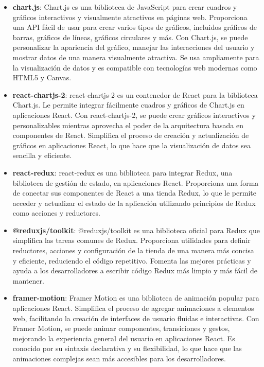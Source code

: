 \documentclass[journal]{IEEEtran}
\begin{document}
\begin{itemize}
  \item \textbf{chart.js}: 
  Chart.js es una biblioteca de JavaScript para crear cuadros y gráficos interactivos y visualmente atractivos en páginas web. Proporciona una API fácil de usar para crear varios tipos de gráficos, incluidos gráficos de barras, gráficos de líneas, gráficos circulares y más. Con Chart.js, se puede personalizar la apariencia del gráfico, manejar las interacciones del usuario y mostrar datos de una manera visualmente atractiva. Se usa ampliamente para la visualización de datos y es compatible con tecnologías web modernas como HTML5 y Canvas.
  \item \textbf{react-chartjs-2}:
  react-chartjs-2 es un contenedor de React para la biblioteca Chart.js. Le permite integrar fácilmente cuadros y gráficos de Chart.js en aplicaciones React. Con react-chartjs-2, se puede crear gráficos interactivos y personalizables mientras aprovecha el poder de la arquitectura basada en componentes de React. Simplifica el proceso de creación y actualización de gráficos en aplicaciones React, lo que hace que la visualización de datos sea sencilla y eficiente.
  \item \textbf{react-redux}:
  react-redux es una biblioteca para integrar Redux, una biblioteca de gestión de estado, en aplicaciones React. Proporciona una forma de conectar sus componentes de React a una tienda Redux, lo que le permite acceder y actualizar el estado de la aplicación utilizando principios de Redux como acciones y reductores.

  \item \textbf{@reduxjs/toolkit}:
  @reduxjs/toolkit es una biblioteca oficial para Redux que simplifica las tareas comunes de Redux. Proporciona utilidades para definir reductores, acciones y configuración de la tienda de una manera más concisa y eficiente, reduciendo el código repetitivo. Fomenta las mejores prácticas y ayuda a los desarrolladores a escribir código Redux más limpio y más fácil de mantener.
  
  \item \textbf{framer-motion}:
  Framer Motion es una biblioteca de animación popular para aplicaciones React. Simplifica el proceso de agregar animaciones a elementos web, facilitando la creación de interfaces de usuario fluidas e interactivas. Con Framer Motion, se puede animar componentes, transiciones y gestos, mejorando la experiencia general del usuario en aplicaciones React. Es conocido por su sintaxis declarativa y su flexibilidad, lo que hace que las animaciones complejas sean más accesibles para los desarrolladores.
\end{itemize}
\end{document}
